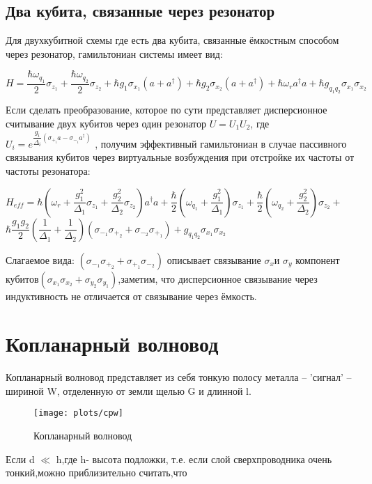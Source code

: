 \documentclass[12pt, a4paper, openany]{book}
\newcommand{\sx}[1]{\ensuremath{{\sigma}_{x_{#1}}}}
\newcommand{\sy}[1]{	\ensuremath{{\sigma}_{y_{#1}}}}
\newcommand{\sz}[1]{	\ensuremath{{\sigma}_{z_{#1}}}}
\newcommand{\sm}[1]{	\ensuremath{{\sigma}_{-_{#1}}}}
\newcommand{\spp}[1]{\ensuremath{{\sigma}_{+_{#1}}}}
\renewcommand{\op}[1]{\ensuremath{{#1}}}
\begin{document}
		\subsection{Два кубита, связанные через резонатор}
Для двухкубитной схемы где есть два кубита, связанные ёмкостным способом через  резонатор, гамильтониан системы имеет вид:
\begin{center}
$H=\dfrac{\hbar\omega_{q_1}}{2}\sz{1}+\dfrac{\hbar \omega_{q_2}}{2}\sz{2}+\hbar g_{1}\sx{1}(a+a^{\dagger})+ \hbar g_{2} \sx{2}(a+a^{\dagger})+\hbar \omega_r a^{\dagger}a+ \hbar g_{q_1q_2}\sx{1}\sx{2}$
\end{center}
Если сделать преобразование, которое по сути представляет дисперсионное считывание двух кубитов через один резонатор
$\op{U}=\op{U_1}\op{U_2}$, где $\op{U_i}=
e^{\dfrac{g_i}{\Delta_i}(\spp{i}a-\sm{i}a^{\dagger})}
$ , получим эффективный гамильтониан в случае пассивного связывания кубитов через виртуальные возбуждения при отстройке их частоты от частоты резонатора:
\begin{center}
$
H_{eff} = \hbar (\omega_r+\dfrac{g_1^2}{\Delta_1}\sz{1}+\dfrac{g_2^2}{\Delta_2}\sz{2}) a^{\dagger}a +\dfrac{\hbar}{2}(\omega_{q_1}+\dfrac{g_1^2}{\Delta_1})\sz{1} +\dfrac{\hbar}{2}(\omega_{q_2}+\dfrac{g_2^2}{\Delta_2})\sz{2} +$\\$\hbar\dfrac{g_1g_2}{2}(\dfrac{1}{\Delta_1}+\dfrac{1}{\Delta_2})(\sm{1}\spp{2}+\sm{2}\spp{1}) 
+g_{q_1q_2}\sx{1}\sx{2}
$
\end{center}
Слагаемое вида:
$(\sm{1}\spp{2}+\spp{1}\sm{2})$ описывает связывание $\sigma_x$и $\sigma_y$ компонент кубитов$(\sx{1}\sx{2}+\sy{2}\sy{1})$,заметим, что дисперсионное связывание через индуктивность не отличается от связывание через ёмкость. 


\section{Копланарный волновод}%
Копланарный волновод представляет из себя тонкую полосу металла -- 'сигнал' -- шириной W, отделенную от земли щелью G и длинной l.
	\begin{figure}[h]
		\begin{center}
\texttt{[image: plots/cpw]}
\caption{Копланарный волновод}
		\end{center}
	\end{figure}

Если d $\ll$ h,где h- высота подложки, т.е. если слой сверхпроводника очень тонкий,можно приблизительно считать,что\cite{Goppl2008}
	
\end{document}
